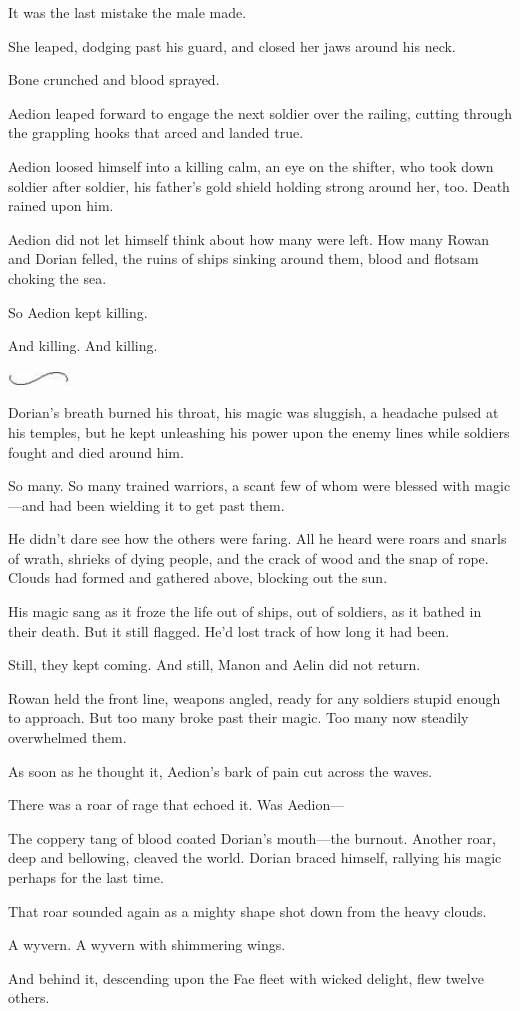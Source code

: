 It was the last mistake the male made.

She leaped, dodging past his guard, and closed her jaws around his neck.

Bone crunched and blood sprayed.

Aedion leaped forward to engage the next soldier over the railing, cutting through the grappling hooks that arced and landed true.

Aedion loosed himself into a killing calm, an eye on the shifter, who took down soldier after soldier, his father's gold shield holding strong around her, too. Death rained upon him.

Aedion did not let himself think about how many were left. How many Rowan and Dorian felled, the ruins of ships sinking around them, blood and flotsam choking the sea.

So Aedion kept killing.

And killing. And killing.

\includegraphics[width=0.65in,height=0.13in]{images/seperator}

Dorian's breath burned his throat, his magic was sluggish, a headache pulsed at his temples, but he kept unleashing his power upon the enemy lines while soldiers fought and died around him.

So many. So many trained warriors, a scant few of whom were blessed with magic---and had been wielding it to get past them.

He didn't dare see how the others were faring. All he heard were roars and snarls of wrath, shrieks of dying people, and the crack of wood and the snap of rope. Clouds had formed and gathered above, blocking out the sun.

His magic sang as it froze the life out of ships, out of soldiers, as it bathed in their death. But it still flagged. He'd lost track of how long it had been.

Still, they kept coming. And still, Manon and Aelin did not return.

Rowan held the front line, weapons angled, ready for any soldiers stupid enough to approach. But too many broke past their magic. Too many now steadily overwhelmed them.

As soon as he thought it, Aedion's bark of pain cut across the waves.

There was a roar of rage that echoed it. Was Aedion---

The coppery tang of blood coated Dorian's mouth---the burnout. Another roar, deep and bellowing, cleaved the world. Dorian braced himself, rallying his magic perhaps for the last time.

That roar sounded again as a mighty shape shot down from the heavy clouds.

A wyvern. A wyvern with shimmering wings.

And behind it, descending upon the Fae fleet with wicked delight, flew twelve others.
